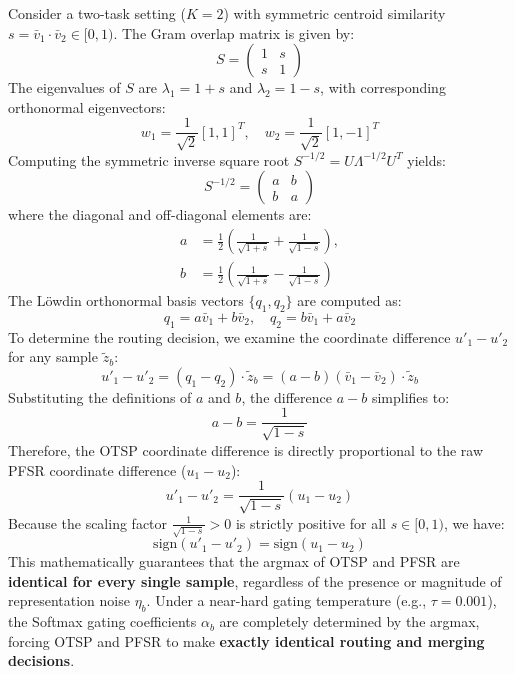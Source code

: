 Consider a two-task setting ($K=2$) with symmetric centroid similarity $s = \bar{v}_1 \cdot \bar{v}_2 \in [0, 1)$. The Gram overlap matrix is given by:
\begin{equation}
S = \begin{pmatrix} 1 & s \\ s & 1 \end{pmatrix}
\end{equation}
The eigenvalues of $S$ are $\lambda_1 = 1+s$ and $\lambda_2 = 1-s$, with corresponding orthonormal eigenvectors:
\begin{equation}
w_1 = \frac{1}{\sqrt{2}} [1, 1]^T, \quad w_2 = \frac{1}{\sqrt{2}} [1, -1]^T
\end{equation}
Computing the symmetric inverse square root $S^{-1/2} = U \Lambda^{-1/2} U^T$ yields:
\begin{equation}
S^{-1/2} = \begin{pmatrix} a & b \\ b & a \end{pmatrix}
\end{equation}
where the diagonal and off-diagonal elements are:
\begin{equation}
\begin{aligned}
a &= \frac{1}{2}\left( \frac{1}{\sqrt{1+s}} + \frac{1}{\sqrt{1-s}} \right), \\
b &= \frac{1}{2}\left( \frac{1}{\sqrt{1+s}} - \frac{1}{\sqrt{1-s}} \right)
\end{aligned}
\end{equation}
The L{\"o}wdin orthonormal basis vectors $\{q_1, q_2\}$ are computed as:
\begin{equation}
q_1 = a \bar{v}_1 + b \bar{v}_2, \quad q_2 = b \bar{v}_1 + a \bar{v}_2
\end{equation}
To determine the routing decision, we examine the coordinate difference $u'_1 - u'_2$ for any sample $\tilde{z}_b$:
\begin{equation}
u'_1 - u'_2 = (q_1 - q_2) \cdot \tilde{z}_b = (a - b) (\bar{v}_1 - \bar{v}_2) \cdot \tilde{z}_b
\end{equation}
Substituting the definitions of $a$ and $b$, the difference $a - b$ simplifies to:
\begin{equation}
a - b = \frac{1}{\sqrt{1-s}}
\end{equation}
Therefore, the OTSP coordinate difference is directly proportional to the raw PFSR coordinate difference ($u_1 - u_2$):
\begin{equation}
u'_1 - u'_2 = \frac{1}{\sqrt{1-s}} (u_1 - u_2)
\end{equation}
Because the scaling factor $\frac{1}{\sqrt{1-s}} > 0$ is strictly positive for all $s \in [0, 1)$, we have:
\begin{equation}
\text{sign}(u'_1 - u'_2) = \text{sign}(u_1 - u_2)
\end{equation}
This mathematically guarantees that the argmax of OTSP and PFSR are \textbf{identical for every single sample}, regardless of the presence or magnitude of representation noise $\eta_b$. Under a near-hard gating temperature (e.g., $\tau = 0.001$), the Softmax gating coefficients $\alpha_b$ are completely determined by the argmax, forcing OTSP and PFSR to make \textbf{exactly identical routing and merging decisions}.

